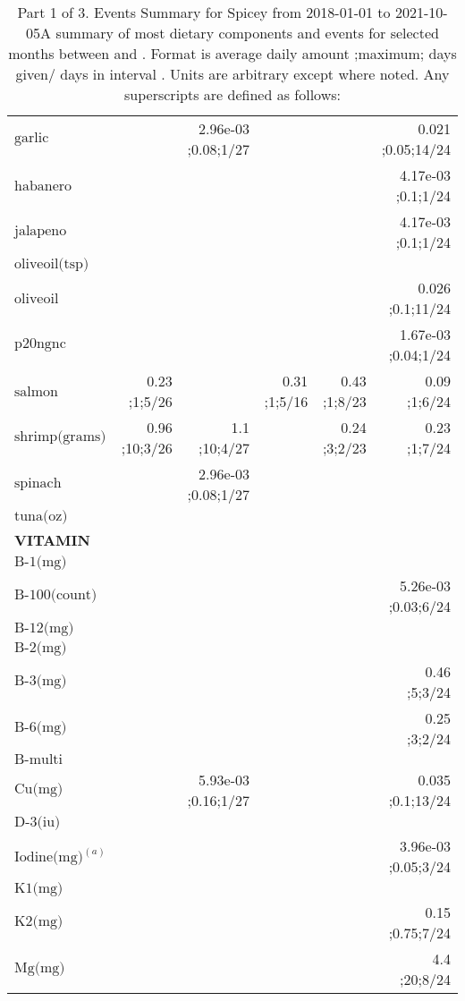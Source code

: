 \begin{table}[H]
\begin{tabular}{|l|r|r|r|r|r|}
$\textrm{garlic}$&&2.96e-03 ;0.08;1/27&&&0.021 ;0.05;14/24\\
$\textrm{habanero}$&&&&&4.17e-03 ;0.1;1/24\\
$\textrm{jalapeno}$&&&&&4.17e-03 ;0.1;1/24\\
$\textrm{oliveoil(tsp)}$&&&&&\\
$\textrm{oliveoil}$&&&&&0.026 ;0.1;11/24\\
$\textrm{p20ngnc}$&&&&&1.67e-03 ;0.04;1/24\\
$\textrm{salmon}$&0.23 ;1;5/26&&0.31 ;1;5/16&0.43 ;1;8/23&0.09 ;1;6/24\\
$\textrm{shrimp(grams)}$&0.96 ;10;3/26&1.1 ;10;4/27&&0.24 ;3;2/23&0.23 ;1;7/24\\
$\textrm{spinach}$&&2.96e-03 ;0.08;1/27&&&\\
$\textrm{tuna(oz)}$&&&&&\\
{\bf VITAMIN}&&&&&\\
$\textrm{B-1(mg)}$&&&&&\\
$\textrm{B-100(count)}$&&&&&5.26e-03 ;0.03;6/24\\
$\textrm{B-12(mg)}$&&&&&\\
$\textrm{B-2(mg)}$&&&&&\\
$\textrm{B-3(mg)}$&&&&&0.46 ;5;3/24\\
$\textrm{B-6(mg)}$&&&&&0.25 ;3;2/24\\
$\textrm{B-multi}$&&&&&\\
$\textrm{Cu(mg)}$&&5.93e-03 ;0.16;1/27&&&0.035 ;0.1;13/24\\
$\textrm{D-3(iu)}$&&&&&\\
$\textrm{Iodine(mg)}^{\left(a\right)}$&&&&&3.96e-03 ;0.05;3/24\\
$\textrm{K1(mg)}$&&&&&\\
$\textrm{K2(mg)}$&&&&&0.15 ;0.75;7/24\\
$\textrm{Mg(mg)}$&&&&&4.4 ;20;8/24\\
\hline
\end{tabular}
\caption{Part 1 of 3.  Events Summary for Spicey   from 2018-01-01 to 2021-10-05A summary of most dietary components and events  for selected months between \mjmdatemin and \mjmdatemax. Format is average daily amount ;maximum; days given/ days in interval . Units are arbitrary except where noted. Any  superscripts are defined as follows:  \mjmsuperscripts}
\end{table}
